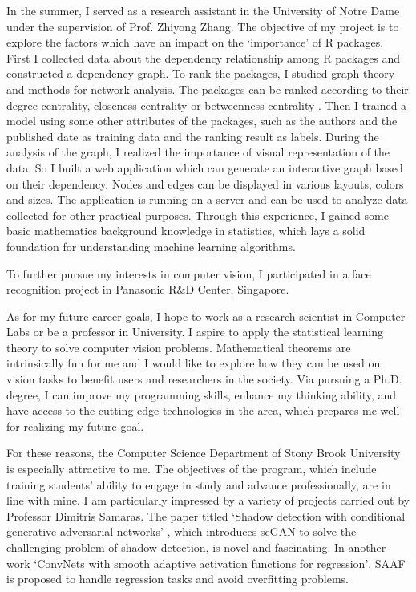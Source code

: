 \documentclass{article}
\begin{document}
\begin{Large}
\par{In the summer, I served as a research assistant in the University of Notre Dame under the supervision of Prof. Zhiyong Zhang. The objective of my project is to explore the factors which have an impact on the ‘importance’ of R packages. First I collected data about the dependency relationship among R packages and constructed a dependency graph. To rank the packages, I studied graph theory and methods for network analysis. The packages can be ranked according to their degree centrality, closeness centrality or betweenness centrality . Then I trained a model using some other attributes of the packages, such as the authors and the published date as training data and the ranking result as labels. During the analysis of the graph, I realized the importance of visual representation of the data. So I built a web application which can generate an interactive graph based on their dependency. Nodes and edges can be displayed in various layouts, colors and sizes. The application is running on a server and can be used to analyze data collected for other practical purposes. Through this experience, I gained some basic mathematics background knowledge in statistics, which lays a solid foundation for understanding machine learning algorithms.}
\par{To further pursue my interests in computer vision, I participated in a face recognition project in Panasonic R\&D Center, Singapore.  
}
\par{As for my future career goals, I hope to work as a research scientist in Computer Labs or be a professor in University. I aspire to apply the statistical learning theory to solve computer vision problems. Mathematical theorems are intrinsically fun for me and I would like to explore how they can be used on vision tasks to benefit users and researchers in the society. Via pursuing a Ph.D. degree, I can improve my programming skills, enhance my thinking ability, and have access to the cutting-edge technologies in the area, which prepares me well for realizing my future goal. 
}
\par{For these reasons, the Computer Science Department of Stony Brook University is especially attractive to me. The objectives of the program, which include training students’ ability to engage in study and advance professionally, are in line with mine. I am particularly impressed by a variety of projects carried out by Professor Dimitris Samaras.  The paper titled ‘Shadow detection with conditional generative adversarial networks’ , which introduces scGAN to solve the challenging problem of shadow detection, is novel and fascinating. In another work ‘ConvNets with smooth adaptive activation functions for regression’, SAAF is proposed to handle regression tasks and avoid overfitting problems.}

\end{Large}
\end{document}
